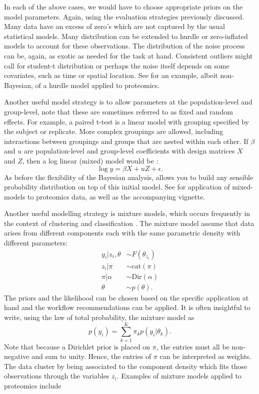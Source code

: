 \documentclass[12pt,english, journal=jpr, layout=twocolumn]{article}
\begin{document}
In each of the above cases, we would have to choose appropriate priors on the model parameters. Again, using the evaluation strategies previously discussed. Many data have an excess of zero's which are not captured by the usual statistical models. Many distribution can be extended to hurdle or zero-inflated models to account for these observations. The distribution of the noise process can be, again, as exotic as needed for the task at hand. Consistent outliers might call for student-t distribution or perhaps the noise itself depends on some covariates, such as time or spatial location. See \citet{Goeminne::2020} for an example, albeit non-Bayesian, of a hurdle model applied to proteomics.

Another useful model strategy is to allow parameters at the population-level and group-level, note that these are sometimes referred to as fixed and random effects. For example, a paired t-test is a linear model with grouping specified by the subject or replicate. More complex groupings are allowed, including interactions between groupings and groups that are nested within each other. If $\beta$ and $u$ are population-level and group-level coefficients with design matrices $X$ and $Z$, then a log linear (mixed) model would be \citep{Bates::2014}:
\begin{equation}
\log y = \beta X + u Z + \epsilon.
\end{equation}
As before the flexibility of the Bayesian analysis, allows you to build any sensible probability distribution on top of this initial model. See \citet{Morris::2008, Morris::2011} for application of mixed-models to proteomics data, as well as the accompanying vignette.

Another useful modelling strategy is mixture models, which occurs frequently in the context of clustering and classification \citep{Mclachlan::2019}. The mixture model assume that data arises from different components each with the same parametric density with different parameters:
\begin{equation}
\begin{split}
y_i|z_i,\theta &\sim F(\theta_{z_i})\\
z_i|\pi & \sim \text{cat}(\pi)\\
\pi|\alpha & \sim \text{Dir}(\alpha)\\
\theta & \sim p(\theta).
\end{split}	
\end{equation}
The priors and the likelihood can be chosen based on the specific application at hand and the workflow recommendations can be applied. It is often insightful to write, using the law of total probability, the mixture model as
\begin{equation}
p(y_i) = \sum_{k = 1}^{K} \pi_k p(y_i|\theta_k).
\end{equation}  
Note that because a Dirichlet prior is placed on $\pi$, the entries must all be non-negative and sum to unity. Hence, the entries of $\pi$ can be interpreted as weights. The data cluster by being associated to the component density which fits those observations through the variables $z_i$. Examples of mixture models applied to proteomics include \citet{Chung::2013, Crook::2018, Crook::2019b}
\end{document}
